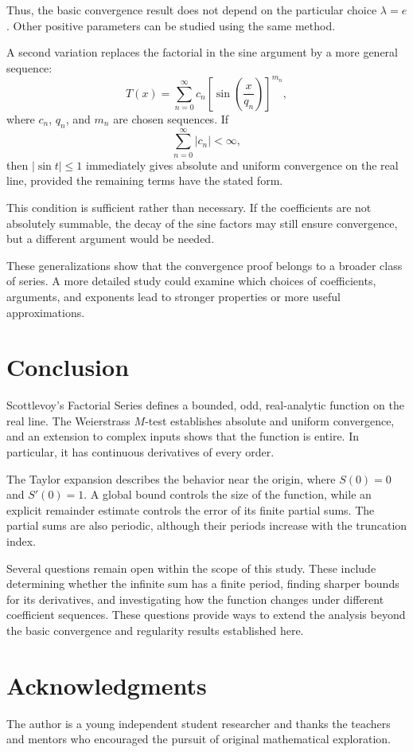\documentclass[12pt]{article}
\theoremstyle{definition}
\theoremstyle{remark}
\begin{document}
Thus, the basic convergence result does not depend on
the particular choice \(\lambda=e\). Other positive
parameters can be studied using the same method.

A second variation replaces the factorial in the sine
argument by a more general sequence:
\[
T(x)=
\sum_{n=0}^{\infty}
c_n\left[\sin\left(\frac{x}{q_n}\right)\right]^{m_n},
\]
where \(c_n\), \(q_n\), and \(m_n\) are chosen sequences.
If
\[
\sum_{n=0}^{\infty}|c_n|<\infty,
\]
then \(|\sin t|\leq 1\) immediately gives absolute and
uniform convergence on the real line, provided the
remaining terms have the stated form.

This condition is sufficient rather than necessary.
If the coefficients are not absolutely summable, the
decay of the sine factors may still ensure convergence,
but a different argument would be needed.

These generalizations show that the convergence proof
belongs to a broader class of series. A more detailed
study could examine which choices of coefficients,
arguments, and exponents lead to stronger properties
or more useful approximations.

\section{Conclusion}

Scottlevoy's Factorial Series defines a bounded, odd,
real-analytic function on the real line. The Weierstrass
\(M\)-test establishes absolute and uniform convergence,
and an extension to complex inputs shows that the function
is entire. In particular, it has continuous derivatives
of every order.

The Taylor expansion describes the behavior near the
origin, where \(S(0)=0\) and \(S'(0)=1\). A global bound
controls the size of the function, while an explicit
remainder estimate controls the error of its finite
partial sums. The partial sums are also periodic, although
their periods increase with the truncation index.

Several questions remain open within the scope of this
study. These include determining whether the infinite sum
has a finite period, finding sharper bounds for its
derivatives, and investigating how the function changes
under different coefficient sequences. These questions
provide ways to extend the analysis beyond the basic
convergence and regularity results established here.


\section{Acknowledgments}
The author is a young independent student researcher and thanks the teachers and mentors who encouraged the pursuit of original mathematical exploration.
\end{document}

